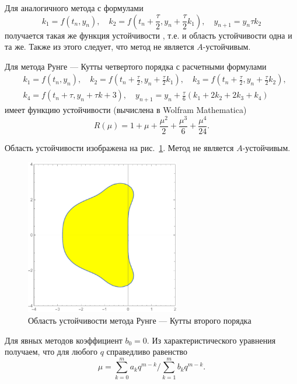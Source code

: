 \documentclass[12pt, a4paper]{article}
\begin{document}
\begin{enumerate}
		Для аналогичного метода с формулами
		\[
		k_1 = f(t_n, y_n), \quad k_2 = f(t_n + \frac\tau2, y_n + \frac\tau2 k_1), \quad y_{n+1} = y_n \tau k_2
		\]
		получается такая же функция устойчивости \cite{lukin}, т.е. и область устойчивости одна и та же. Также из этого следует, что метод не является $A$-устойчивым.
		
		Для метода Рунге --- Кутты четвертого порядка с расчетными формулами
		\begin{eqnarray*}
			& k_1 = f(t_n, y_n), \quad k_2 = f(t_n + \frac\tau2, y_n + \frac\tau2 k_1), \quad k_3 = f(t_n + \frac\tau2, y_n + \frac\tau2 k_2),\\
			& k_4 = f(t_n + \tau, y_n + \tau k+3), \quad  y_{n+1} = y_n + \frac\tau6 \left(k_1 + 2 k_2 + 2 k_3 + k_4\right)
		\end{eqnarray*}
		имеет функцию устойчивости (вычислена в Wolfram Mathematica)
		\[
		R(\mu) = 1 + \mu + \frac{\mu^2}2 + \frac{\mu^3}6 + \frac{\mu^4}{24}.
		\]
		
		Область устойчивости изображена на рис.~\ref{rk4}. Метод не является $A$-устойчивым.
		
		\begin{figure}[H]
			\centering
			\includegraphics[width=0.6\textwidth]{rk4}
			\caption{Область устойчивости метода Рунге --- Кутты второго порядка}
			\label{rk4}
		\end{figure}
		
		
		Для явных методов коэффициент $b_0 = 0$. Из характеристического уравнения получаем, что для любого $q$ справедливо равенство
		\[
		\mu = \sum_{k=0}^m a_k q^{m-k} \Big/ \sum_{k=1}^m b_k q^{m-k}.
		\]
		

\end{enumerate}
\end{document}
